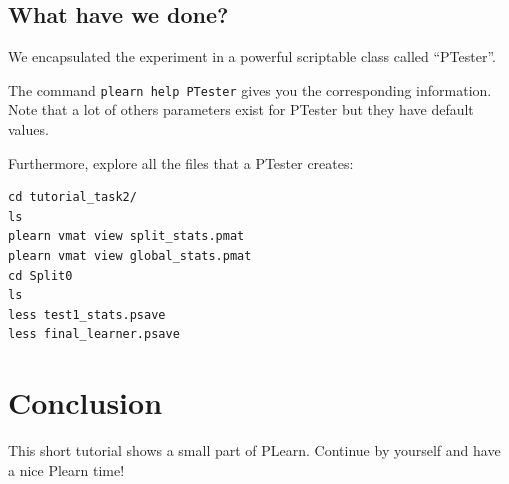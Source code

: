 \subsection{What have we done?}

We encapsulated the experiment in a powerful scriptable class called ``PTester''.

The command \texttt{plearn help PTester} gives you the corresponding information.
Note that a lot of others parameters exist for PTester but they have default values.

Furthermore, explore all the files that a PTester creates:

\begin{verbatim}
cd tutorial_task2/
ls
plearn vmat view split_stats.pmat
plearn vmat view global_stats.pmat
cd Split0
ls
less test1_stats.psave
less final_learner.psave
\end{verbatim}


\section{Conclusion}
This short tutorial shows a small part of PLearn. Continue by yourself and have a nice Plearn time! 



